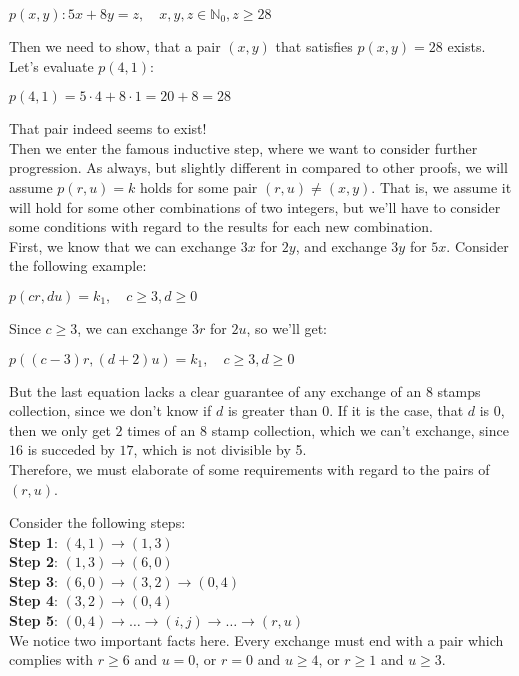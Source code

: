 \documentclass{report}
\newcommand{\cent}[1]{\begin{center}#1\end{center}}
\newcommand{\doubleN}{\mathbb{N}}
\newcommand{\In}{\! \in \!}
\newcommand{\defaultEnumerateLabel}{\textbf{\alph*.}}
\begin{document}
\begin{enumerate}[label=\defaultEnumerateLabel]
 		\cent{$p(x,y) : 5x+8y = z, \quad x,y,z \In \doubleN_0, z \geq 28$}
 		
 		Then we need to show, that a pair $(x,y)$ that satisfies $p(x,y) = 28$ exists. Let's evaluate $p(4,1)$:
 		
 		\cent{$p(4,1) = 5\cdot 4 + 8\cdot 1 = 20 +8 = 28$} 
 		
 		That pair indeed seems to exist!\\
 		
 		Then we enter the famous inductive step, where we want to consider further progression. As always, but slightly different in compared to other proofs, we will assume $p(r,u) = k$ holds for some pair $(r,u) \neq (x,y)$.  That is, we assume it will hold for some other combinations of two integers, but we'll have to consider some conditions with regard to the results for each new combination. \\
 		
 		First, we know that we can exchange $3x$ for $2y$, and exchange $3y$ for $5x$. Consider the following example:
 		
 		\cent{$p(cr,du) = k_1, \quad c \geq 3, d \geq 0$}
 		
 		Since $c\geq 3$, we can exchange $3r$ for $2u$, so we'll get:
 		
 		\cent{$p((c-3)r,(d+2)u) = k_1, \quad c \geq 3, d \geq 0$}
 		
 		But the last equation lacks a clear guarantee of any exchange of an 8 stamps collection, since we don't know if $d$ is greater than $0$. If it is the case, that $d$ is $0$, then we only get $2$ times of an 8 stamp collection, which we can't exchange, since $16$ is succeded by $ 17 $, which is not divisible by 5. \\
 		
 		Therefore, we must elaborate of some requirements with regard to the pairs of $(r,u)$. 
 		
 		Consider the following steps:\\
 		
		\textbf{Step 1}: $(4,1) \to (1,3)$\\
		\textbf{Step 2}: $(1,3) \to (6,0)$\\
		\textbf{Step 3}: $(6,0) \to (3,2) \to (0,4)$\\
		\textbf{Step 4}: $(3,2) \to (0,4)$ \\
		\textbf{Step 5}: $(0,4) \to \dots  \to (i,j) \to \dots \to (r,u)$\\
 			
 		We notice two important facts here. Every exchange must end with a pair which complies with $r \geq 6$ and $u = 0$, or $r = 0$ and $u \geq 4$, or $r \geq 1$ and $u \geq 3$. 
 		

\end{enumerate}
\end{document}
